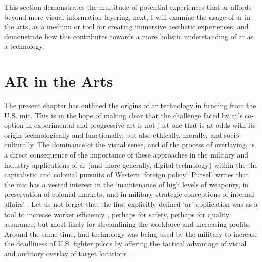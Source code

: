 This section demonstrates the multitude of potential experiences that \gls{ar} affords beyond mere visual information layering, next, I will examine the usage of \gls{ar} in the arts, as a medium or tool for creating immersive aesthetic experiences, and demonstrate how this contributes towards a more holistic understanding of \gls{ar} as a technology. 



\section{AR in the Arts}\label{sec: ar-arts}
The present chapter has outlined the origins of \gls{ar} technology in funding from the U.S. \gls{mic}. This is in the hope of making clear that the challenge faced by \gls{ar}'s co-option in experimental and progressive art is not just one that is at odds with its origin technologically and functionally, but also ethically, morally, and socio-culturally. The dominance of the visual sense, and of the process of overlaying, is a direct consequence of the importance of these approaches in the military and industry applications of \gls{ar} (and more generally, digital technology) within the the capitalistic and colonial pursuits of Western `foreign policy'. Pursell writes that the \gls{mic} has a vested interest in the `maintenance of high levels of weaponry, in preservation of colonial markets, and in military-strategic conceptions of internal affairs' \citeyearpar{pursell1972}. Let us not forget that the first explicitly defined `\gls{ar}' application was as a tool to increase worker efficiency \citep{caudell1992}, perhaps for safety, perhaps for quality assurance, but most likely for streamlining the workforce and increasing profits. Around the same time, \gls{hud} technology was being used by the military to increase the deadliness of U.S. fighter pilots by offering the tactical advantage of visual and auditory overlay of target locations \citep{wanstall1989}. 

